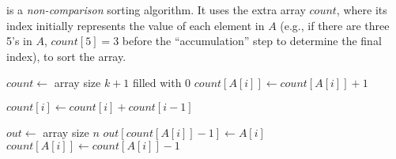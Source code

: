  is a \textit{non-comparison} sorting algorithm. It uses the extra array $count$, where its index initially represents the value of each element in $A$ (e.g., if there are three 5's in $A$, $count[5] = 3$ before the ``accumulation'' step to determine the final index), to sort the array.

\noindent \hrulefill

\begin{algorithmic}[1]
   
    \State $count \gets$ array size $k + 1$ filled with 0
     
      \State $count[A[i]] \gets count[A[i]] + 1$
    \EndFor
    \item[]
     
      \State $count[i] \gets count[i] + count[i - 1]$
    \EndFor
    \item[]
    \State $out \gets$ array size $n$
     
      \State $out[count[A[i]] - 1] \gets A[i]$
      \State $count[A[i]] \gets count[A[i]] - 1$
    \EndFor
    \item[]
    \State {}
  \EndFunction
\end{algorithmic}
\noindent \hrulefill

